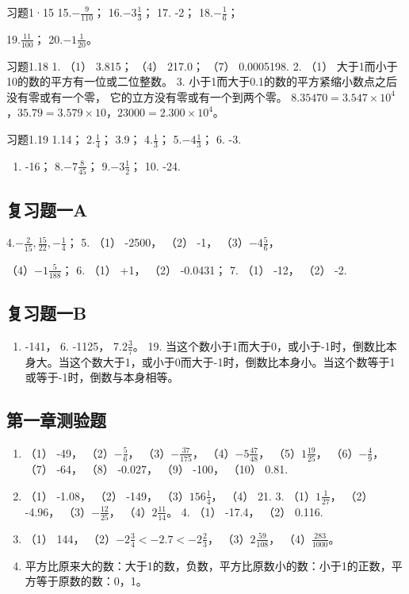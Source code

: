 习题1·15 15.\(-\frac{9}{110}\)； 16.\(-3\frac{1}{3}\)； 17.
-2； 18.\(-\frac{1}{6}\)；

19.\(\frac{11}{100}\)； 20.\(-1\frac{1}{20}\)。

习题1.18 1. （1） 3.815； （4） 217.0； （7） 0.0005198. 2. （1）
大于1而小于10的数的平方有一位或二位整数。 3.
小于1而大于0.1的数的平方紧缩小数点之后没有零或有一个零，
它的立方没有零或有一个到两个零。
8.\(35470 = 3.547 \times 10^{4}\)，\(35.79 = 3.579 \times 10\)，\(23000 = 2.300 \times 10^{4}\)。

习题1.19 1.14； 2.\(\frac{1}{4}\)； 3.9； 4.\(\frac{1}{3}\)；
5.\(-4\frac{1}{3}\)； 6. -3.

\begin{enumerate}[start=7]
\item
  -16； 8.\(-7\frac{8}{45}\)； 9.\(-3\frac{1}{2}\)； 10. -24.
\end{enumerate}

\subsection{复习题一A}

4.\(-\frac{2}{15}, \frac{15}{22}, -\frac{1}{4}\)； 5. （1） -2500，
（2） -1， （3）\(-4\frac{5}{6}\)，

（4）\(-1\frac{5}{188}\)； 6. （1） +1， （2） -0.0431； 7. （1） -12，
（2） -2.

\subsection{复习题一B}

\begin{enumerate}[start=5]
\item
  -141， 6. -1125， 7.\(2\frac{3}{7}\)。 19.
  当这个数小于1而大于0，或小于-1时，倒数比本身大。当这个数大于1，或小于0而大于-1时，倒数比本身小。当这个数等于1或等于-1时，倒数与本身相等。
\end{enumerate}

\subsection{第一章测验题}

\begin{enumerate}
\item
  （1） -49， （2）\(-\frac{5}{6}\)， （3）\(-\frac{37}{175}\)，
  （4）\(-5\frac{47}{48}\)， （5）\(1\frac{19}{25}\)，
  （6）\(-\frac{4}{9}\)， （7） -64， （8） -0.027， （9） -100， （10）
  0.81.
\item
  （1） -1.08， （2） -149， （3）\(156\frac{1}{4}\)， （4） 21. 3.
  （1）\(1\frac{1}{27}\)， （2） -4.96， （3）\(-\frac{12}{25}\)，
  （4）\(2\frac{11}{14}\)。 4. （1） -17.4， （2） 0.116.
\item
  （1） 144， （2）\(-2\frac{3}{4} < -2.7 < -2\frac{2}{3}\)，
  （3）\(2\frac{59}{108}\)， （4）\(\frac{283}{1000}\)。
\item
  平方比原来大的数：大于1的数，负数，平方比原数小的数：小于1的正数，平方等于原数的数：0，1。
\end{enumerate}

